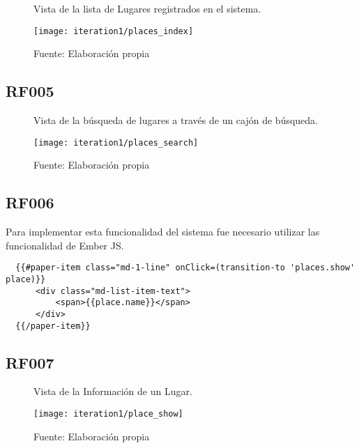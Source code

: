 \begin{figure}[H]
  \begin{center}
    \caption{Vista de la lista de Lugares registrados en el sistema.}
    \label{fig:places_index}
    \texttt{[image: iteration1/places\_index]}
    \caption*{Fuente: Elaboración propia}
  \end{center}
\end{figure}

\subsection{RF005}
\label{sub:RF005}

\begin{figure}[H]
  \begin{center}
    \caption{Vista de la búsqueda de lugares a través de un cajón de búsqueda.}
    \label{fig:places_search}
    \texttt{[image: iteration1/places\_search]}
    \caption*{Fuente: Elaboración propia}
  \end{center}
\end{figure}


\subsection{RF006}
\label{sub:RF006}

Para implementar esta funcionalidad del sistema fue necesario utilizar las funcionalidad de Ember JS.

\begin{verbatim}
  {{#paper-item class="md-1-line" onClick=(transition-to 'places.show' place)}}
      <div class="md-list-item-text">
          <span>{{place.name}}</span>
      </div>
  {{/paper-item}}
\end{verbatim}

\subsection{RF007}
\label{sub:RF007}



\begin{figure}[H]
  \begin{center}
    \caption{Vista de la Información de un Lugar.}
    \label{fig:place_show}
    \texttt{[image: iteration1/place\_show]}
    \caption*{Fuente: Elaboración propia}
  \end{center}
\end{figure}


